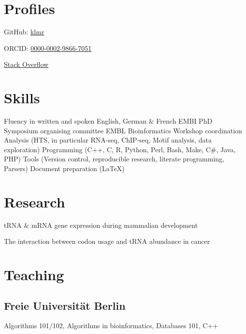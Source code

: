 \documentclass{klmr-cv}
\newcommand*\csharp{C\#}
\newcommand*\cpp{C++}
\begin{document}
\section{Profiles}

\item{GitHub: \href{http://github.com/klmr}{klmr}}
\item{ORCID: \href{http://orcid.org/0000-0002-9866-7051}{0000-0002-9866-7051}}
\item{\href{http://stackoverflow.com/users/1968/konrad-rudolph}{Stack Overflow}}

\section{Skills}

\begin{itemize}
    \listitem Fluency in written and spoken English, German \& French
    \listitem EMBI PhD Symposium organising committee
    \listitem EMBL Bioinformatics Workshop coordination
    \listitem Analysis (HTS, in particular RNA-seq, ChIP-seq, Motif analysis,
        data exploration)
    \listitem Programming (\cpp, C, R, Python, Perl, Bash, Make, \csharp, Java, PHP)
    \listitem Tools (Version control, reproducible research, literate
        programming, Parsers)
    \listitem Document preparation (\LaTeX)
\end{itemize}

\body

\section{Research}

\date{2011--2014}
\item{tRNA \& mRNA gene expression during mammalian development}

\date{2014--2015}
\item{The interaction between codon usage and tRNA abundance in cancer}

\section{Teaching}

\subsection{Freie Universität Berlin}

\date{2008--2011}
\item{}
\item{Algorithms 101/102, Algorithms in bioinformatics, Databases 101, \cpp}
\end{document}
